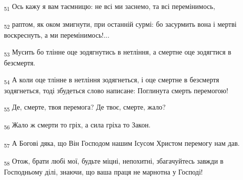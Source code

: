 \begin{tcolorbox}
\textsubscript{51} Ось кажу я вам таємницю: не всі ми заснемо, та всі перемінимось,
\end{tcolorbox}
\begin{tcolorbox}
\textsubscript{52} раптом, як оком змигнути, при останній сурмі: бо засурмить вона і мертві воскреснуть, а ми перемінимось!...
\end{tcolorbox}
\begin{tcolorbox}
\textsubscript{53} Мусить бо тлінне оце зодягнутись в нетління, а смертне оце зодягтися в безсмертя.
\end{tcolorbox}
\begin{tcolorbox}
\textsubscript{54} А коли оце тлінне в нетління зодягнеться, і оце смертне в безсмертя зодягнеться, тоді збудеться слово написане: Поглинута смерть перемогою!
\end{tcolorbox}
\begin{tcolorbox}
\textsubscript{55} Де, смерте, твоя перемога? Де твоє, смерте, жало?
\end{tcolorbox}
\begin{tcolorbox}
\textsubscript{56} Жало ж смерти то гріх, а сила гріха то Закон.
\end{tcolorbox}
\begin{tcolorbox}
\textsubscript{57} А Богові дяка, що Він Господом нашим Ісусом Христом перемогу нам дав.
\end{tcolorbox}
\begin{tcolorbox}
\textsubscript{58} Отож, брати любі мої, будьте міцні, непохитні, збагачуйтесь завжди в Господньому ділі, знаючи, що ваша праця не марнотна у Господі!
\end{tcolorbox}
